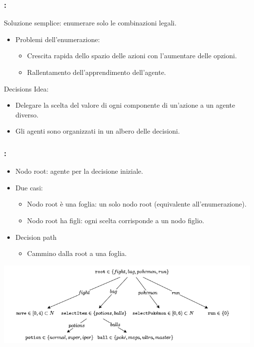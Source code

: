 \documentclass[compress]{beamer}
\begin{document}
\begin{frame}
    \frametitle{\subsecname: \subsubsecname}
    Soluzione semplice: enumerare solo le combinazioni legali.
    \begin{itemize}
        \item Problemi dell'enumerazione:
        \begin{itemize}
            \item Crescita rapida dello spazio delle azioni con l'aumentare delle opzioni.
            \item Rallentamento dell'apprendimento dell'agente.
        \end{itemize}
    \end{itemize}
    \vspace{0.5cm}
    Decisions Idea:
    \begin{itemize}
        \item Delegare la scelta del valore di ogni componente di un'azione a un agente diverso.
        \item Gli agenti sono organizzati in un albero delle decisioni.
    \end{itemize}
\end{frame}

\begin{frame}
    \frametitle{\subsecname: \subsubsecname}
    \begin{itemize}
        \item Nodo root: agente per la decisione iniziale.
        \item Due casi:
        \begin{itemize}
            \item Nodo root è una foglia: un solo nodo root (equivalente all'enumerazione).
            \item Nodo root ha figli: ogni scelta corrisponde a un nodo figlio.
        \end{itemize}
        \item Decision path
        \begin {itemize}
            \item Cammino dalla root a una foglia.
        \end{itemize}
    \end{itemize}
    \begin{adjustbox}{margin=0cm 0cm 0cm 0.5cm, center} %
        \includegraphics[width=.8\textwidth]{figs/decisions.drawio.png}
    \end{adjustbox}
\end{frame}
\end{document}

